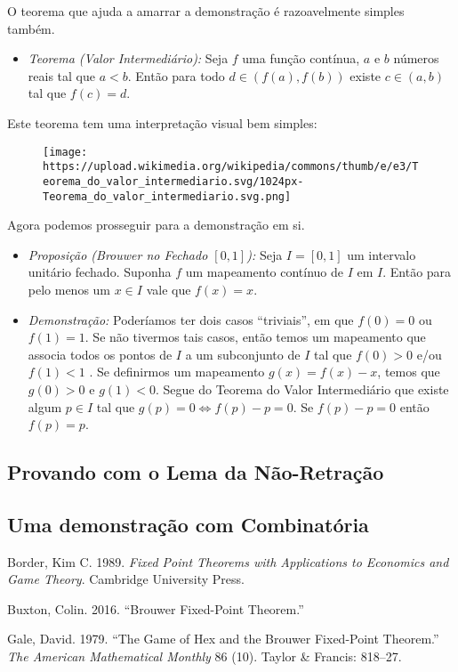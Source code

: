 \documentclass[]{article}
\providecommand{\tightlist}{%
  \setlength{\itemsep}{0pt}\setlength{\parskip}{0pt}}
\begin{document}
O teorema que ajuda a amarrar a demonstração é razoavelmente simples
também.

\begin{itemize}
\tightlist
\item
  \emph{Teorema (Valor Intermediário):} Seja \(f\) uma função contínua,
  \(a\) e \(b\) números reais tal que \(a < b\). Então para todo
  \(d \in (f(a),f(b))\) existe \(c \in (a,b)\) tal que \(f(c) = d\).
\end{itemize}

Este teorema tem uma interpretação visual bem simples:

\begin{figure}
\centering
\texttt{[image: https://upload.wikimedia.org/wikipedia/commons/thumb/e/e3/Teorema\_do\_valor\_intermediario.svg/1024px-Teorema\_do\_valor\_intermediario.svg.png]}
\caption{}
\end{figure}

Agora podemos prosseguir para a demonstração em si.

\begin{itemize}
\item
  \emph{Proposição (Brouwer no Fechado \([0,1]\)):} Seja \(I=[0,1]\) um
  intervalo unitário fechado. Suponha \(f\) um mapeamento contínuo de
  \(I\) em \(I\). Então para pelo menos um \(x \in I\) vale que
  \(f(x)=x\).
\item
  \emph{Demonstração:} Poderíamos ter dois casos ``triviais'', em que
  \(f(0)=0\) ou \(f(1)=1\). Se não tivermos tais casos, então temos um
  mapeamento que associa todos os pontos de \(I\) a um subconjunto de
  \(I\) tal que \(f(0)>0\) e/ou \(f(1) < 1\) . Se definirmos um
  mapeamento \(g(x)= f(x) - x\), temos que \(g(0) > 0\) e \(g(1) < 0\).
  Segue do Teorema do Valor Intermediário que existe algum \(p \in I\)
  tal que \(g(p) = 0 \iff f(p) - p = 0\). Se \(f(p) - p = 0\) então
  \(f(p)=p\).
\end{itemize}

\subsection{Provando com o Lema da
Não-Retração}\label{provando-com-o-lema-da-nao-retracao}

\subsection*{Uma demonstração com
Combinatória}\label{uma-demonstracao-com-combinatoria}

\hypertarget{refs}{}
\hypertarget{ref-border}{}
Border, Kim C. 1989. \emph{Fixed Point Theorems with Applications to
Economics and Game Theory}. Cambridge University Press.

\hypertarget{ref-buxton}{}
Buxton, Colin. 2016. ``Brouwer Fixed-Point Theorem.''

\hypertarget{ref-gale}{}
Gale, David. 1979. ``The Game of Hex and the Brouwer Fixed-Point
Theorem.'' \emph{The American Mathematical Monthly} 86 (10). Taylor \&
Francis: 818--27.
\end{document}
